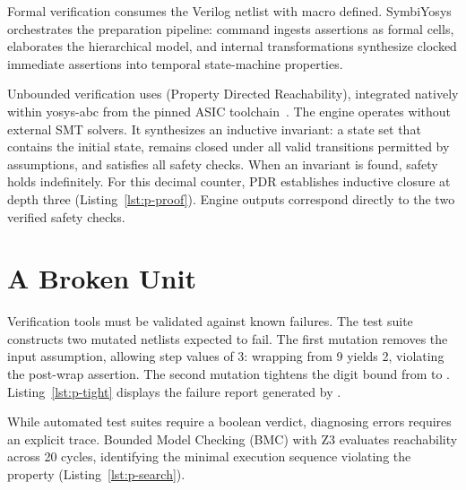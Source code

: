 \documentclass[journal,9pt]{IEEEtran}
\begin{document}
Formal verification consumes the Verilog netlist with macro 
defined. SymbiYosys orchestrates the preparation pipeline: command
 ingests assertions as formal cells,  elaborates
the hierarchical model, and internal transformations synthesize clocked
immediate assertions into temporal state-machine properties.

Unbounded verification uses  (Property Directed Reachability),
integrated natively within yosys-abc from the pinned ASIC toolchain~\cite{cover}.
The engine operates without external SMT solvers. It synthesizes an inductive
invariant: a state set that contains the initial state, remains closed under all
valid transitions permitted by assumptions, and satisfies all safety checks.
When an invariant is found, safety holds indefinitely. For this decimal counter,
PDR establishes inductive closure at depth three (Listing~\ref{lst:p-proof}).
Engine outputs correspond directly to the two verified safety checks.



\section{A Broken Unit}
\label{sec:p-broken}

Verification tools must be validated against known failures. The test suite
constructs two mutated netlists expected to fail. The first mutation removes the
input assumption, allowing step values of 3: wrapping from 9 yields 2, violating
the post-wrap assertion. The second mutation tightens the digit bound from
 to . Listing~\ref{lst:p-tight} displays
the failure report generated by .



While automated test suites require a boolean verdict, diagnosing errors
requires an explicit trace. Bounded Model Checking (BMC) with Z3 evaluates
reachability across 20 cycles, identifying the minimal execution sequence
violating the property (Listing~\ref{lst:p-search}).


\end{document}

